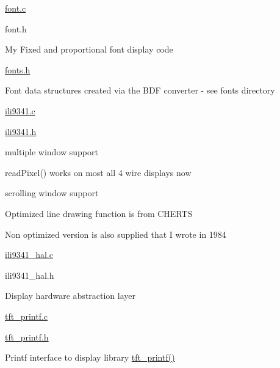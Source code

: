 \begin{DoxyItemize}
\begin{DoxyItemize}
\begin{DoxyItemize}
\item \hyperlink{font_8c}{font.\+c}
\item font.\+h
\begin{DoxyItemize}
\item My Fixed and proportional font display code
\end{DoxyItemize}
\item \hyperlink{fonts_8h}{fonts.\+h}
\begin{DoxyItemize}
\item Font data structures created via the B\+DF converter -\/ see fonts directory
\end{DoxyItemize}
\item \hyperlink{ili9341_8c}{ili9341.\+c}
\item \hyperlink{ili9341_8h}{ili9341.\+h}
\begin{DoxyItemize}
\item multiple window support
\item read\+Pixel() works on most all 4 wire displays now
\item scrolling window support
\item Optimized line drawing function is from C\+H\+E\+R\+TS
\begin{DoxyItemize}
\item Non optimized version is also supplied that I wrote in 1984
\end{DoxyItemize}
\end{DoxyItemize}
\item \hyperlink{ili9341__hal_8c}{ili9341\+\_\+hal.\+c}
\item ili9341\+\_\+hal.\+h
\begin{DoxyItemize}
\item Display hardware abstraction layer
\end{DoxyItemize}
\item \hyperlink{tft__printf_8c}{tft\+\_\+printf.\+c}
\item \hyperlink{tft__printf_8h}{tft\+\_\+printf.\+h}
\begin{DoxyItemize}
\item Printf interface to display library \hyperlink{tft__printf_8c_ad6d6dda4facdc045d477c0cc9403e0c1}{tft\+\_\+printf()}
\end{DoxyItemize}
\end{DoxyItemize}
\end{DoxyItemize}
\end{DoxyItemize}

